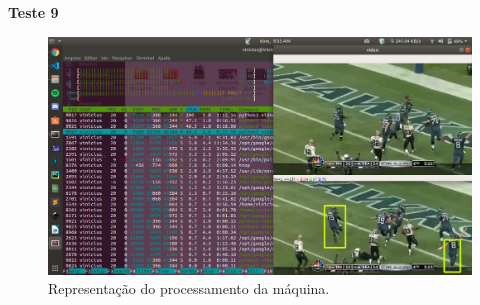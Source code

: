 \textbf{Teste 9}
\begin{figure}
    \centering
    \caption{Representação do processamento da máquina.}
    \includegraphics[scale=0.2]{05-SLIDES_DESENVOLVIMENTO/Etapa_de_Testes/imagens_testes/processamento_maquina.png}
\end{figure}